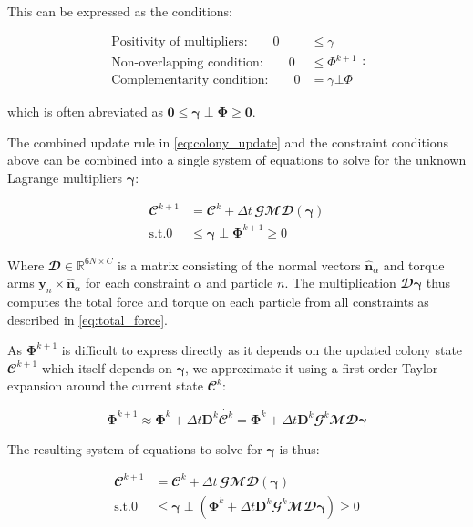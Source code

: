 \documentclass[conference]{IEEEtran}
\begin{document}
This can be expressed as the conditions:

$$
    \begin{align}
        \text{Positivity of multipliers:} \qquad  0 & \leq \gamma        \\
        \text{Non-overlapping condition:} \qquad  0 & \leq \Phi^{k+1}    \\
        \text{Complementarity condition:} \qquad  0 & = \gamma \bot \Phi
    \end{align}:
$$

which is often abreviated as $\mathbf{0} \leq \mathbf{\gamma} \perp \mathbf{\Phi} \geq \mathbf{0}$.


The combined update rule in \autoref{eq:colony_update} and the constraint conditions above can be combined into a single system of equations to solve for the unknown Lagrange multipliers $\mathbf{\gamma}$:

$$
    \begin{align}
        \mathbfcal{C}^{k+1} & = \mathbfcal{C}^k + \Delta t \, \mathbfcal{G}\mathbfcal{M} \mathbfcal{D}(\mathbf{\gamma}) \\
        \text{s.t.} 0       & \leq \mathbf{\gamma} \perp \mathbf{\Phi}^{k+1} \geq 0
    \end{align}
$$

Where $\mathbfcal{D} \in \mathbb{R}^{6N \times C}$ is a matrix consisting of the normal vectors $\hat{\mathbf{n}}_\alpha$ and torque arms $\mathbf{y}_n \times \hat{\mathbf{n}}_\alpha$ for each constraint $\alpha$ and particle $n$. The multiplication $\mathbfcal{D}\mathbf{\gamma}$ thus computes the total force and torque on each particle from all constraints as described in \autoref{eq:total_force}.


As $\mathbf{\Phi}^{k+1}$ is difficult to express directly as it depends on the updated colony state $\mathbfcal{C}^{k+1}$ which itself depends on $\mathbf{\gamma}$, we approximate it using a first-order Taylor expansion around the current state $\mathbfcal{C}^k$:

$$
    \mathbf{\Phi}^{k+1} \approx \mathbf{\Phi}^k + \Delta t \mathbf{D}^k \dot{\mathbfcal{C}^k} = \mathbf{\Phi}^k + \Delta t \mathbf{D}^k \mathbfcal{G}^k \mathbfcal{M} \mathbfcal{D} \mathbf{\gamma}
$$

The resulting system of equations to solve for $\mathbf{\gamma}$ is thus:

$$
    \begin{align}
        \mathbfcal{C}^{k+1} & = \mathbfcal{C}^k + \Delta t \, \mathbfcal{G}\mathbfcal{M} \mathbfcal{D}(\mathbf{\gamma})                                                            \\
        \text{s.t.} 0       & \leq \mathbf{\gamma} \perp \left( \mathbf{\Phi}^k + \Delta t \mathbf{D}^k \mathbfcal{G}^k \mathbfcal{M} \mathbfcal{D} \mathbf{\gamma} \right) \geq 0
    \end{align}
$$
\end{document}
